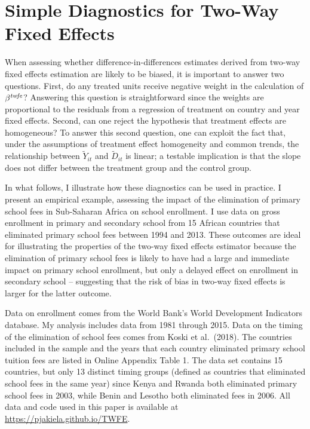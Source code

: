 \documentclass[11pt]{article}
\begin{document}
\section{Simple Diagnostics for Two-Way Fixed Effects}

When assessing whether difference-in-differences estimates 
derived from two-way fixed effects estimation are likely to be biased, it is important to answer 
two questions.  First, do any treated units receive negative weight in the calculation of 
$ \beta^{\textit{\scriptsize{twfe}}}$?  Answering this question is straightforward since the 
weights are proportional to the residuals from a regression of treatment on country and year 
fixed effects.  Second, can one reject the hypothesis 
that treatment effects are homogeneous?  To answer this second question, one can exploit the fact that, 
under the assumptions of treatment effect homogeneity and common trends, the relationship between $\tilde{Y}_{it}$ 
and $\tilde{D}_{it}$ is linear; a testable implication is that the slope does not differ between the treatment group and the control group.  

In what follows, I illustrate how these diagnostics can be used in practice.  I present an empirical example, 
assessing the impact of the elimination of primary school fees in Sub-Saharan Africa on school enrollment.    
I use data on gross enrollment in primary and secondary school from 15 African countries 
that eliminated primary school fees between 1994 and 2013.  These outcomes are ideal for illustrating 
the properties of the two-way fixed effects estimator because the elimination of primary school fees is likely 
to have had a large and immediate impact on primary school enrollment, but only a delayed effect on enrollment in secondary 
school -- suggesting that the risk of bias in two-way fixed effects is larger for the latter outcome.  

Data on enrollment comes 
from the World Bank's World Development Indicators database.  My analysis includes data from 1981 through 2015.  
Data on the timing of the elimination of school fees  comes from Koski et al.~(2018).  The countries included 
in the sample and the years that each country eliminated 
primary school tuition fees are listed in Online Appendix Table 1.  The data set contains 15 countries, 
but only 13 distinct timing groups (defined as countries that eliminated school fees in the same year) since 
Kenya and Rwanda both eliminated primary school fees in 2003, while Benin and Lesotho both eliminated fees in 2006.  
All data and code used in this paper is available at \url{https://pjakiela.github.io/TWFE}.
\end{document}
